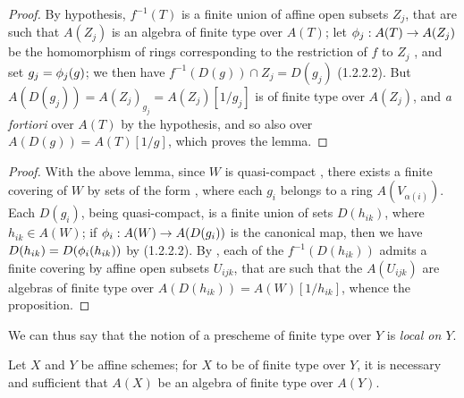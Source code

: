 \begin{proof}
\label{proof-I.6.3.2.1}
By hypothesis, $f^{-1}(T)$ is a finite union of affine open subsets $Z_j$, that are such that $A(Z_j)$ is an algebra of finite type over $A(T)$;
let $\vphi_j:A(T)\to A(Z_j)$ be the homomorphism of rings corresponding to the restriction of $f$ to $Z_j$ , and set $g_j=\phi_j(g)$;
we then have $f^{-1}(D(g))\cap Z_j=D(g_j)$ (1.2.2.2).
But $A(D(g_j))=A(Z_j)_{g_j}=A(Z_j)[1/g_j]$ is of finite type over $A(Z_j)$, and \emph{a fortiori} over $A(T)$ by the hypothesis, and so also over $A(D(g))=A(T)[1/g]$, which proves the lemma.
\end{proof}

\begin{proof}
\label{proof-I.6.3.2}
With the above lemma, since $W$ is quasi-compact , there exists a finite covering of $W$ by sets of the form , where each $g_i$ belongs to a ring $A(V_{\alpha(i)})$.
Each $D(g_i)$, being quasi-compact, is a finite union of sets $D(h_{ik})$, where $h_{ik}\in A(W)$;
if $\vphi_i:A(W)\to A(D(g_i))$ is the canonical map, then we have $D(h_{ik})=D(\phi_i(h_{ik}))$ by (1.2.2.2).
By , each of the $f^{-1}(D(h_{ik}))$ admits a finite covering by affine open subsets $U_{ijk}$, that are such that the $A(U_{ijk})$ are algebras of finite type over $A(D(h_{ik}))=A(W)[1/h_{ik}]$, whence the proposition.
\end{proof}

We
can thus say that the notion of a prescheme of finite type over $Y$ is \emph{local on $Y$}.

\begin{proposition}[6.3.3]
\label{I.6.3.3}
Let $X$ and $Y$ be affine schemes;
for $X$ to be of finite type over $Y$, it is necessary and sufficient that $A(X)$ be an algebra of finite type over $A(Y)$.
\end{proposition}

